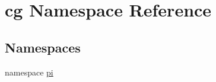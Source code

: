 \hypertarget{namespacecg}{\section{cg \-Namespace \-Reference}
\label{namespacecg}
}
\subsection*{\-Namespaces}
\begin{DoxyCompactItemize}
\item 
namespace \hyperlink{namespacecg_1_1pi}{pi}
\end{DoxyCompactItemize}
